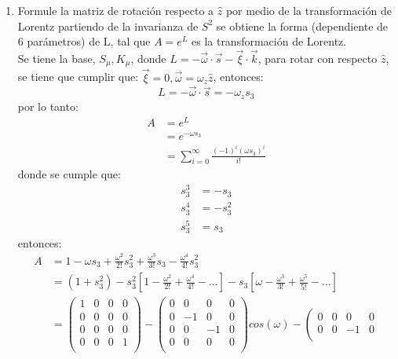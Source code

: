 \documentclass[12pt,letterpaper]{report}
\begin{document}
\begin{enumerate}
\item Formule la matriz de rotación respecto a $\hat{z}$ por medio de la transformación de Lorentz partiendo de la invarianza de $S^2$ se obtiene la 
forma (dependiente de 6 parámetros) de L, tal que $A=e^L$ es la transformación de Lorentz.\\
Se tiene la base, $S_\mu , K_\mu$, donde $L=-\vec{\omega}\cdot \vec{s}- \vec{\xi}\cdot \vec{k}$, para rotar con respecto $\hat{z}$, se tiene que cumplir que:
$\vec{\xi}=0 , \vec{\omega}=\omega_z \hat{z}$, entonces:
\begin{equation*}
    L=-\vec{\omega}\cdot \vec{s}=-\omega_z s_3
\end{equation*}
por lo tanto:
\begin{align*}
    A&=e^L \\
    &=e^{-\omega s_3}\\
    &=\sum_{i=0}^\infty \frac{(-1)^i(\omega s_3)^i}{i!} 
\end{align*}
donde se cumple que: 
\begin{align*}
    s^3_3&=-s_3\\
s^4_3&=-s_3^2\\
s_3^5&=s_3
\end{align*}
entonces:
\begin{align*}
    A&=1-\omega s_3 + \frac{\omega^2}{2!}s_3^2 + \frac{\omega^3}{3!}s_3 - \frac{\omega^4}{4!}s_3^2\\
    &=(1+s_3^2)-s_3^2\left[1-\frac{\omega^2}{2!}+\frac{\omega^4}{4!}-\dots \right] - s_3 \left[\omega - \frac{\omega^3}{3!}+\frac{\omega^5}{5!}-\dots \right]\\
    &= \left(\begin{matrix}
        1 & 0 & 0 & 0 \\
        0 & 0 & 0 & 0 \\
        0 & 0 & 0 & 0 \\
        0 & 0 & 0 & 1 \\
    \end{matrix}\right) - \left(\begin{matrix}
        0 & 0 & 0 & 0 \\
        0 &-1 & 0 & 0 \\
        0 & 0 & -1 & 0 \\
        0 & 0 & 0 & 0 \\
    \end{matrix}\right) cos(\omega) - \left(\begin{matrix}
        0 & 0 & 0 & 0 \\
        0 & 0 & -1 & 0 \\

\end{matrix}
\end{align*}
\end{enumerate}
\end{document}
